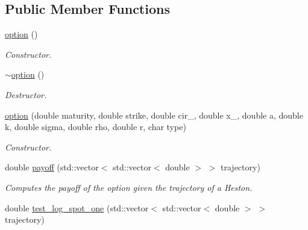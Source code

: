 \subsection*{Public Member Functions}
\begin{DoxyCompactItemize}
\item 
\hyperlink{classoption_aae400d0330363c992401fd59b6b1e499}{option} ()\hypertarget{classoption_aae400d0330363c992401fd59b6b1e499}{}\label{classoption_aae400d0330363c992401fd59b6b1e499}

\begin{DoxyCompactList}\small\item\em Constructor. \end{DoxyCompactList}\item 
\hyperlink{classoption_aeeb6541a65f9268f3e92cc8d1b1c2d16}{$\sim$option} ()\hypertarget{classoption_aeeb6541a65f9268f3e92cc8d1b1c2d16}{}\label{classoption_aeeb6541a65f9268f3e92cc8d1b1c2d16}

\begin{DoxyCompactList}\small\item\em Destructor. \end{DoxyCompactList}\item 
\hyperlink{classoption_ab2f0aa182faced1a9fa14ebe24485a13}{option} (double maturity, double strike, double cir\+\_, double x\+\_, double a, double k, double sigma, double rho, double r, char type)\hypertarget{classoption_ab2f0aa182faced1a9fa14ebe24485a13}{}\label{classoption_ab2f0aa182faced1a9fa14ebe24485a13}

\begin{DoxyCompactList}\small\item\em Constructor. \end{DoxyCompactList}\item 
double \hyperlink{classoption_aa5cfc4d34a55ab409553af33109099a6}{payoff} (std\+::vector$<$ std\+::vector$<$ double $>$ $>$ trajectory)\hypertarget{classoption_aa5cfc4d34a55ab409553af33109099a6}{}\label{classoption_aa5cfc4d34a55ab409553af33109099a6}

\begin{DoxyCompactList}\small\item\em Computes the payoff of the option given the trajectory of a Heston. \end{DoxyCompactList}\item 
double \hyperlink{classoption_ae1b1d237ddf3d294cf42cdf33eeea7ba}{test\+\_\+log\+\_\+spot\+\_\+one} (std\+::vector$<$ std\+::vector$<$ double $>$ $>$ trajectory)\hypertarget{classoption_ae1b1d237ddf3d294cf42cdf33eeea7ba}{}\label{classoption_ae1b1d237ddf3d294cf42cdf33eeea7ba}


\end{DoxyCompactItemize}
